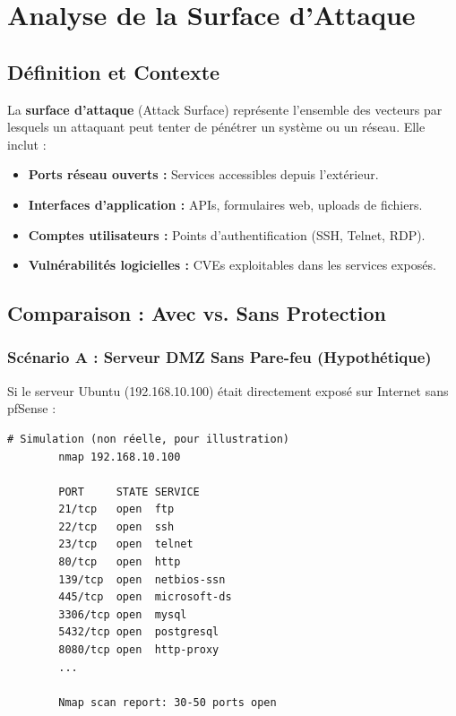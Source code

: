\documentclass[12pt,a4paper,openany]{report}
\begin{document}
	\chapter{Analyse de la Surface d'Attaque}
	
	\section{Définition et Contexte}
	La \textbf{surface d'attaque} (Attack Surface) représente l'ensemble des vecteurs par lesquels un attaquant peut tenter de pénétrer un système ou un réseau. Elle inclut :
	
	\begin{itemize}
		\item \textbf{Ports réseau ouverts :} Services accessibles depuis l'extérieur.
		\item \textbf{Interfaces d'application :} APIs, formulaires web, uploads de fichiers.
		\item \textbf{Comptes utilisateurs :} Points d'authentification (SSH, Telnet, RDP).
		\item \textbf{Vulnérabilités logicielles :} CVEs exploitables dans les services exposés.
	\end{itemize}
	
	\section{Comparaison : Avec vs. Sans Protection}
	
	\subsection{Scénario A : Serveur DMZ Sans Pare-feu (Hypothétique)}
	Si le serveur Ubuntu (192.168.10.100) était directement exposé sur Internet sans pfSense :
	
	\begin{lstlisting}[caption=Scan Nmap hypothétique sans pare-feu]
		# Simulation (non réelle, pour illustration)
		nmap 192.168.10.100
		
		PORT     STATE SERVICE
		21/tcp   open  ftp
		22/tcp   open  ssh
		23/tcp   open  telnet
		80/tcp   open  http
		139/tcp  open  netbios-ssn
		445/tcp  open  microsoft-ds
		3306/tcp open  mysql
		5432/tcp open  postgresql
		8080/tcp open  http-proxy
		...
		
		Nmap scan report: 30-50 ports open
	\end{lstlisting}
	
\end{document}

